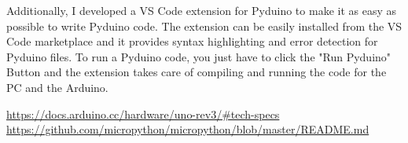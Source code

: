 \documentclass{article}
\begin{document}
\begin{multicols}{2}
Additionally, I developed a VS Code extension for Pyduino to make it as easy as possible to write Pyduino code. The extension can be easily installed from the VS Code marketplace and it provides syntax highlighting and error detection for Pyduino files. To run a Pyduino code, you just have to click the "Run Pyduino" Button and the extension takes care of compiling and running the code for the PC and the Arduino.



\begin{thebibliography}{99}
\url{https://docs.arduino.cc/hardware/uno-rev3/#tech-specs}
\url{https://github.com/micropython/micropython/blob/master/README.md}
\end{thebibliography}
\end{multicols}
\end{document}
